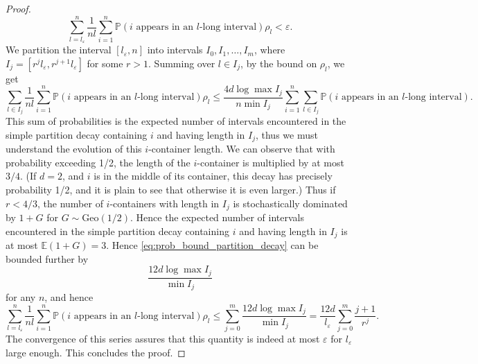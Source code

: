 \documentclass[10pt,a4paper]{amsart}
\newcommand{\EE}{\mathbb{E}}
\newcommand{\PP}{\mathbb{P}}
\begin{document}
\begin{proof}
    $$\sum_{l=l_\varepsilon}^{n}\frac{1}{nl}\sum_{i=1}^n\PP(\text{$i$ appears in an $l$-long interval})\rho_l<\varepsilon.$$
    We partition the interval $[l_\varepsilon, n]$ into intervals $I_0, I_1, \dots, I_m$, where $I_j =[r^jl_\varepsilon, r^{j+1}l_\varepsilon]$ for some $r>1$. Summing over $l\in I_j$, by the bound on $\rho_l$, we get
    \begin{equation}\label{eq:prob_bound_partition_decay}
    \sum_{l\in I_j}\frac{1}{nl}\sum_{i=1}^n\PP(\text{$i$ appears in an $l$-long interval})\rho_l\leq \frac{4d \log \max I_j}{n \min I_j}\sum_{i=1}^{n}\sum_{l\in I_j}\PP(\text{$i$ appears in an $l$-long interval}).
    \end{equation}
    This sum of probabilities is the expected number of intervals encountered in the simple partition decay containing $i$ and having length in $I_j$, thus we must understand the evolution of this $i$-container length. We can observe that with probability exceeding 1/2, the length of the $i$-container is multiplied by at most $3/4$. (If $d=2$, and $i$ is in the middle of its container, this decay has precisely probability 1/2, and it is plain to see that otherwise it is even larger.) Thus if $r<4/3$, the number of $i$-containers with length in $I_j$ is stochastically dominated by $1+G$ for $G\sim \mathrm{Geo}(1/2)$. Hence the expected number of intervals encountered in the simple partition decay containing $i$ and having length in $I_j$ is at most $\EE(1+G)=3$. Hence \eqref{eq:prob_bound_partition_decay} can be bounded further by
    $$\frac{12d \log \max I_j}{\min I_j}$$
    for any $n$, and hence 
    $$\sum_{l=l_\varepsilon}^{n}\frac{1}{nl}\sum_{i=1}^n\PP(\text{$i$ appears in an $l$-long interval})\rho_l\leq \sum_{j=0}^{m}\frac{12d \log \max I_j}{\min I_j}=\frac{12d}{l_\varepsilon}\sum_{j=0}^{m}\frac{j+1}{r^j}.$$
    The convergence of this series assures that this quantity is indeed at most $\varepsilon$ for $l_{\varepsilon}$ large enough. This concludes the proof.
    \end{proof}
\end{document}
